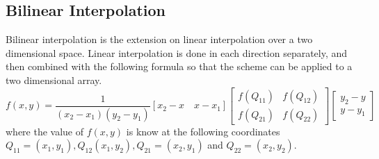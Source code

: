 \documentclass{article}
\begin{document}
\subsection{Bilinear Interpolation}
\label{subsec:bilinear}
Bilinear interpolation is the extension on linear interpolation over a
two dimensional space. Linear interpolation is done in each direction
separately, and then combined with the following formula so that the
scheme can be applied to a two dimensional array.
\[f(x, y) = \frac{1}{(x_2 - x_1)(y_2-y_1)} [x_2-x \quad x - x_1]
\begin{bmatrix} f(Q_{11}) & f(Q_{12}) \\ f(Q_{21}) & f(Q_{22}) \end{bmatrix} \begin{bmatrix} y_2 - y \\ y-y_1 \end{bmatrix}\]
where the value of $f(x, y)$ is know at the following coordinates $Q_{11} = (x_1, y_1), Q_{12}(x_1, y_2), Q_{21}=
(x_2, y_1)$ and $Q_{22} = (x_2, y_2)$.
\end{document}
